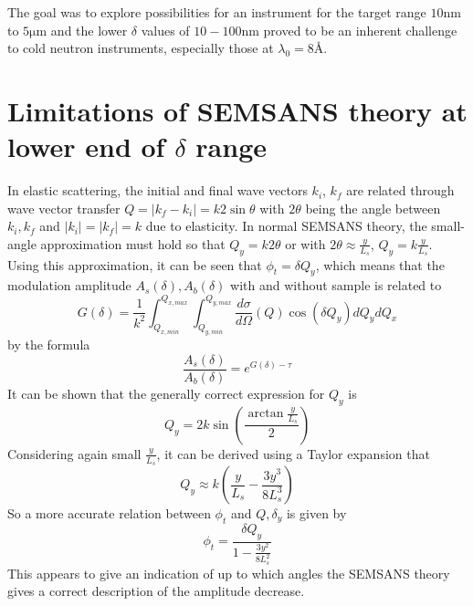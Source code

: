 \documentclass{article}
\newcommand{\targetrange}{$10 \unit{\nano\meter}$ to $5 \unit{\micro\meter}$ }
\begin{document}
The goal was to explore possibilities for an instrument for the target range \targetrange and the lower $\delta$ values of $10 - 100 \unit{\nano\meter}$ proved to be an inherent challenge to cold neutron instruments, especially those at $\lambda_0 = 8$Å. 


\printbibliography

\appendix
\section{Limitations of SEMSANS theory at lower end of $\delta$ range}
\label{appendix-a}
In elastic scattering, the initial and final wave vectors $k_i$, $k_f$ are related through wave vector transfer $Q = |k_f - k_i| = k 2\sin\theta$ with $2\theta$ being the angle between $k_i, k_f$ and $|k_i| = |k_f| = k$ due to elasticity. In normal SEMSANS theory, the small-angle approximation must hold so that $Q_y = k2\theta$ or with $2\theta \approx \frac{y}{L_s}$, $Q_y = k\frac{y}{L_s}$. Using this approximation, it can be seen that $\phi_t = \delta Q_y$, which means that the modulation amplitude $A_s(\delta), A_b(\delta)$ with and without sample is related to
$$G(\delta) = \frac{1}{k^2}\int_{Q_{x,min}}^{Q_{x,max}}\int_{Q_{y,min}}^{Q_{y,max}}\dfrac{d\sigma}{d\Omega}(Q)\cos(\delta Q_y)dQ_ydQ_x$$
by the formula
$$\frac{A_s(\delta)}{A_b(\delta)} = e^{G(\delta) - \tau}$$
It can be shown that the generally correct expression for $Q_y$ is 
$$Q_y = 2k\sin(\frac{\arctan\frac{y}{L_s}}{2})$$
Considering again small $\frac{y}{L_s}$, it can be derived using a Taylor expansion that $$Q_y \approx  k(\frac{y}{L_s} - \frac{3y^3}{8L_s^3})$$ So a more accurate relation between $\phi_t$ and $Q, \delta_y$ is given by $$\phi_t = \frac{\delta Q_y}{1 - \frac{3y^2}{8L_s^2}}$$ This appears to give an indication of up to which angles the SEMSANS theory gives a correct description of the amplitude decrease.
\end{document}
